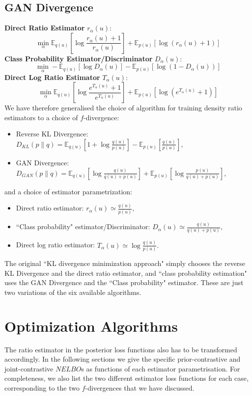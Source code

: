 \documentclass[honours,12pt]{unswthesis}
\newcommand{\E}{\mathbb{E}}
\numberwithin{equation}{section}
\theoremstyle{definition}
\begin{document}
\subsection{GAN Divergence}
\textbf{Direct Ratio Estimator} $r_\alpha(u)$:
\[\min_\alpha \E_{q(u)}\left[\log \frac{r_\alpha(u)+1}{r_\alpha(u)}\right]+\E_{p(u)}[\log (r_\alpha(u)+1)]\]
\textbf{Class Probability Estimator/Discriminator} $D_\alpha(u)$:
\[\min_\alpha -\E_{q(u)}[\log D_\alpha(u)]-\E_{p(u)}[\log (1-D_\alpha(u))]\]
\textbf{Direct Log Ratio Estimator} $T_\alpha(u)$:
\[\min_\alpha \E_{q(u)}\left[\log \frac{e^{T_\alpha(u)}+1}{e^{T_\alpha(u)}}\right]+\E_{p(u)}[\log(e^{T_\alpha(u)}+1)]\]
We have therefore generalised the choice of algorithm for training density ratio estimators to a choice of $f$-divergence:
\begin{itemize}
\item Reverse KL Divergence: $D_{KL}(p\|q)=\mathbb{E}_{q(u)}[1+\log \frac{q(u)}{p(u)}]-\mathbb{E}_{p(u)}\left[\frac{q(u)}{p(u)}\right]$,
\item GAN Divergence: $D_{GAN}(p\|q)=\mathbb{E}_{q(u)}\left[\log \frac{q(u)}{q(u)+p(u)}\right]+\mathbb{E}_{p(u)}\left[\log \frac{p(u)}{q(u)+p(u)}\right]$,
\end{itemize}
and a choice of estimator parametrization:
\begin{itemize}
\item Direct ratio estimator: $r_\alpha(u)\simeq\frac{q(u)}{p(u)}$,
\item ``Class probability" estimator/Discriminator: $D_\alpha(u)\simeq\frac{q(u)}{q(u)+p(u)}$,
\item Direct log ratio estimator: $T_\alpha(u)\simeq\log \frac{q(u)}{p(u)}.$
\end{itemize}
The original ``KL divergence minimization approach" simply chooses the reverse KL Divergence and the direct ratio estimator, and ``class probability estimation" uses the GAN Divergence and the ``Class probability" estimator. These are just two variations of the six available algorithms.
\section{Optimization Algorithms}
The ratio estimator in the posterior loss functions also has to be transformed accordingly. In the following sections we give the specific prior-contrastive and joint-contrastive $NELBO$s as functions of each estimator parametrisation. For completeness, we also list the two different estimator loss functions for each case, corresponding to the two $f$-divergences that we have discussed.
\end{document}

